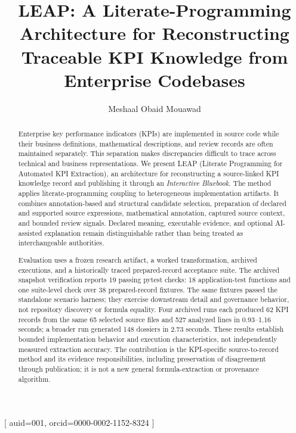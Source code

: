 \documentclass[a4paper,fleqn]{cas-dc}
\newcommand{\tool}{\textsc{LEAP}}
\newcommand{\bluebook}{\emph{Interactive Bluebook}}
\begin{document}
\let\WriteBookmarks\relax
\def\floatpagepagefraction{1}
\def\textpagefraction{.001}


\title[mode=title]{LEAP: A Literate-Programming Architecture for Reconstructing Traceable KPI Knowledge from Enterprise Codebases}

\author[1]{Meshaal Obaid Mouawad}[
  auid=001,
  orcid=0000-0002-1152-8324
]
\cormark[1]



\begin{abstract}
Enterprise key performance indicators (KPIs) are implemented in source code while their business definitions, mathematical descriptions, and review records are often maintained separately. This separation makes discrepancies difficult to trace across technical and business representations. We present \tool{} (Literate Programming for Automated KPI Extraction), an architecture for reconstructing a source-linked KPI knowledge record and publishing it through an \bluebook{}. The method applies literate-programming coupling to heterogeneous implementation artifacts. It combines annotation-based and structural candidate selection, preparation of declared and supported source expressions, mathematical annotation, captured source context, and bounded review signals. Declared meaning, executable evidence, and optional AI-assisted explanation remain distinguishable rather than being treated as interchangeable authorities.

Evaluation uses a frozen research artifact, a worked transformation, archived executions, and a historically traced prepared-record acceptance suite. The archived snapshot verification reports 19 passing pytest checks: 18 application-test functions and one suite-level check over 38 prepared-record fixtures. The same fixtures passed the standalone scenario harness; they exercise downstream detail and governance behavior, not repository discovery or formula equality. Four archived runs each produced 62 KPI records from the same 65 selected source files and 527 analyzed lines in 0.93--1.16 seconds; a broader run generated 148 dossiers in 2.73 seconds. These results establish bounded implementation behavior and execution characteristics, not independently measured extraction accuracy. The contribution is the KPI-specific source-to-record method and its evidence responsibilities, including preservation of disagreement through publication; it is not a new general formula-extraction or provenance algorithm.

\end{abstract}
\end{document}
